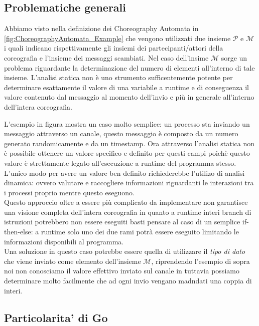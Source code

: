 \subsection{Problematiche generali} %
Abbiamo visto nella definizione dei Choreography Automata in \ref{fig:ChoreographyAutomata_Example} che vengono utilizzati due insieme $\mathcal{P}$ e $\mathcal{M}$ i quali indicano rispettivamente gli insiemi dei partecipanti/attori della coreografia e l'insieme dei messaggi scambiati. Nel caso dell'insime $\mathcal{M}$ sorge un problema riguardante la determinazione del numero di elementi all'interno di tale insieme.
L'analisi statica non è uno strumento sufficentemente potente per determinare esattamente il valore di una variabile a runtime e di conseguenza il valore contenuto dal messaggio al momento dell'invio e più in generale all'interno dell'intera coreografia.

L'esempio in figura mostra un caso molto semplice: un processo sta inviando un messaggio attraverso un canale, questo messaggio è composto da un numero generato randomicamente e da un timestamp. Ora attraverso l'analisi statica non è possibile ottenere un valore specifico  e definito per questi campi poichè questo valore è strettamente legato all'esecuzione a runtime del programma stesso. L'unico modo per avere un valore ben definito richiederebbe l'utilizo di analisi dinamica: ovvero valutare e raccogliere informazioni riguardanti le interazioni tra i processi proprio mentre questo eseguono.\\ 
Questo approccio oltre a essere più complicato da implementare non garantisce una visione completa dell'intera coreografia in quanto a runtime interi branch di istruzioni potrebbero non essere eseguiti basti pensare al caso di un semplice if-then-else: a runtime solo uno dei due rami potrà essere eseguito limitando le informazioni disponibili al programma.\\
Una soluzione in questo caso potrebbe essere quella di utilizzare il \emph{tipo di dato} che viene inviato come elemento dell'insieme $\mathcal{M}$, riprendendo l'esempio di sopra noi non conosciamo il valore effettivo inviato sul canale in tuttavia possiamo determinare molto facilmente che ad ogni invio vengano madndati una coppia di interi.

\subsection{Particolarita' di Go}